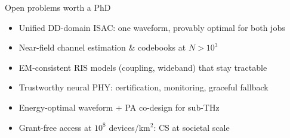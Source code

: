 \begin{frame}{Open problems worth a PhD}
  \begin{itemize}\itemsep1pt
    \item Unified DD-domain ISAC: one waveform, provably optimal for both
          jobs \hfill{}
    \item Near-field channel estimation \& codebooks at $N>10^3$
          \hfill{}
    \item EM-consistent RIS models (coupling, wideband) that stay tractable
          \hfill{}
    \item Trustworthy neural PHY: certification, monitoring, graceful
          fallback \hfill{}
    \item Energy-optimal waveform + PA co-design for sub-THz
          \hfill{}
    \item Grant-free access at $10^8$ devices/km$^2$: CS at societal scale
          \hfill{}
  \end{itemize}
\end{frame}

